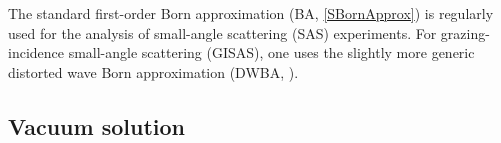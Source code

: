 The standard first-order Born approximation (BA, \cref{SBornApprox})
is regularly used  for the analysis of small-angle scattering (SAS) experiments.
%
%
%
For grazing-incidence small-angle scattering (GISAS),
one uses the slightly more generic distorted wave Born approximation (DWBA, ).
%


\subsection{Vacuum solution}\label{Sfarfield}


